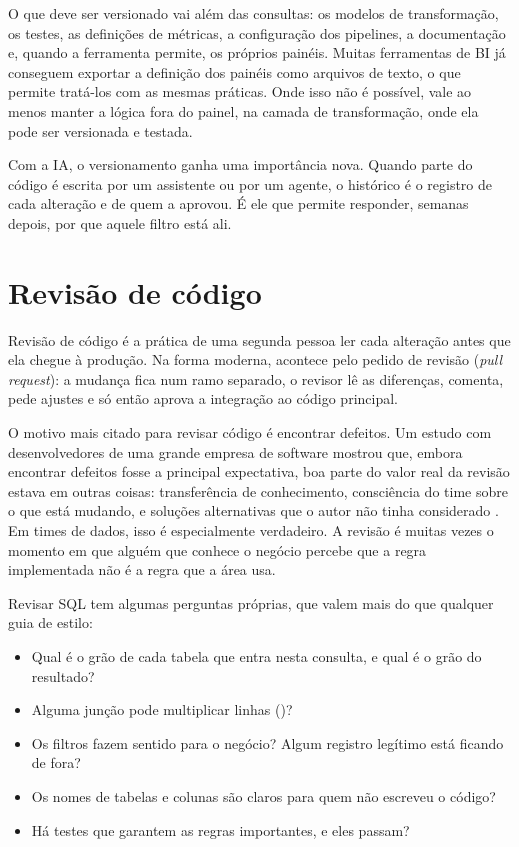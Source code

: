 O que deve ser versionado vai além das consultas: os modelos de transformação, os testes, as
definições de métricas, a configuração dos pipelines, a documentação e, quando a ferramenta
permite, os próprios painéis. Muitas ferramentas de BI já conseguem exportar a definição dos
painéis como arquivos de texto, o que permite tratá-los com as mesmas práticas. Onde isso
não é possível, vale ao menos manter a lógica fora do painel, na camada de transformação,
onde ela pode ser versionada e testada.

Com a IA, o versionamento ganha uma importância nova. Quando parte do código é escrita por
um assistente ou por um agente, o histórico é o registro de cada alteração e de quem a
aprovou. É ele que permite responder, semanas depois, por que aquele filtro está ali.

\section{Revisão de código}
\label{sec:revisao-codigo}

Revisão de código é a prática de uma segunda pessoa ler cada alteração antes que ela chegue à
produção. Na forma moderna, acontece pelo pedido de revisão (\emph{pull request}): a mudança
fica num ramo separado, o revisor lê as diferenças, comenta, pede ajustes e só então aprova a
integração ao código principal.

O motivo mais citado para revisar código é encontrar defeitos. Um estudo com desenvolvedores
de uma grande empresa de software mostrou que, embora encontrar defeitos fosse a principal
expectativa, boa parte do valor real da revisão estava em outras coisas: transferência de
conhecimento, consciência do time sobre o que está mudando, e soluções alternativas que o
autor não tinha considerado \parencite{bacchelli2013}. Em times de dados, isso é especialmente
verdadeiro. A revisão é muitas vezes o momento em que alguém que conhece o negócio percebe que
a regra implementada não é a regra que a área usa.

Revisar SQL tem algumas perguntas próprias, que valem mais do que qualquer guia de estilo:

\begin{itemize}
  \item Qual é o grão de cada tabela que entra nesta consulta, e qual é o grão do resultado?
  \item Alguma junção pode multiplicar linhas ()?
  \item Os filtros fazem sentido para o negócio? Algum registro legítimo está ficando de fora?
  \item Os nomes de tabelas e colunas são claros para quem não escreveu o código?
  \item Há testes que garantem as regras importantes, e eles passam?
\end{itemize}


